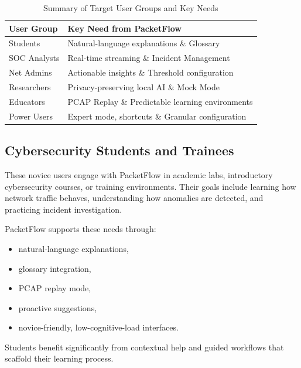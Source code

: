 \documentclass[
    11pt, 
    a4paper, 
    parskip=half, 
    headsepline,       %
    DIV=12             %
]{scrartcl}
\begin{document}
\begin{table}[h]
    \centering
    \renewcommand{\arraystretch}{1.3} %
    \caption{Summary of Target User Groups and Key Needs}
    \begin{tabularx}{\linewidth}{lX}
        \toprule
        \textbf{\color{pfBlue} User Group} & \textbf{\color{pfBlue} Key Need from PacketFlow} \\
        \midrule
        Students & Natural-language explanations \& Glossary \\
        SOC Analysts & Real-time streaming \& Incident Management \\
        Net Admins & Actionable insights \& Threshold configuration \\
        Researchers & Privacy-preserving local AI \& Mock Mode \\
        Educators & PCAP Replay \& Predictable learning environments \\
        Power Users & Expert mode, shortcuts \& Granular configuration \\
        \bottomrule
    \end{tabularx}
\end{table}

\subsection{Cybersecurity Students and Trainees}
These novice users engage with PacketFlow in academic labs, introductory cybersecurity courses, or training environments. Their goals include learning how network traffic behaves, understanding how anomalies are detected, and practicing incident investigation.

PacketFlow supports these needs through:
\begin{itemize}
    \item natural-language explanations,
    \item glossary integration,
    \item PCAP replay mode,
    \item proactive suggestions,
    \item novice-friendly, low-cognitive-load interfaces.
\end{itemize}

Students benefit significantly from contextual help and guided workflows that scaffold their learning process.
\end{document}
